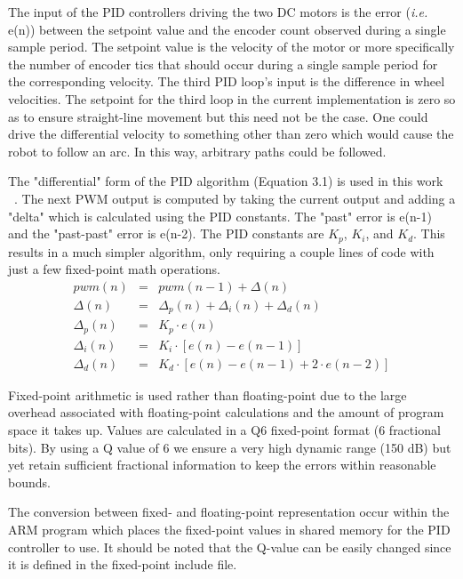 \documentclass[12pt,oneside,final]{siuethesis}
\theoremstyle{definition}
\begin{document}
The input of the PID controllers driving the two DC motors is the error (\emph{i.e.} e(n)) between the setpoint value and the encoder count observed during a single sample period. The setpoint value is the velocity of the motor or more specifically the number of encoder tics that should occur during a single sample period for the corresponding velocity. The third PID loop's input is the difference in wheel velocities. The setpoint for the third loop in the current implementation is zero so as to ensure straight-line movement but this need not be the case. One could drive the differential velocity to something other than zero which would cause the robot to follow an arc. In this way, arbitrary paths could be followed.

The "differential" form of the PID algorithm (Equation 3.1) is used in this work ~\cite{PIDctrl}.  The next PWM output is computed by taking the current output and adding a "delta" which is calculated using the PID constants. The "past" error is e(n-1) and the "past-past" error is e(n-2).  The PID constants are $K_p$, $K_i$, and $K_d$. This results in a much simpler algorithm, only requiring a couple lines of code with just a few fixed-point math operations.
\begin{eqnarray}
pwm(n) &=& pwm(n-1) + \Delta(n) \\
\Delta(n) &=& \Delta_p(n) + \Delta_i(n) + \Delta_d(n) \nonumber \\
\Delta_p(n) &=& K_p \cdot e(n) \nonumber \\
\Delta_i(n) &=& K_i \cdot \left[ e(n) - e(n-1) \right] \nonumber \\
\Delta_d(n) &=& K_d \cdot \left[ e(n) - e(n-1) + 2 \cdot e(n-2) \right] \nonumber
\end{eqnarray}

Fixed-point arithmetic is used rather than floating-point due to the large overhead associated with floating-point calculations and the amount of program space it takes up.  Values are calculated in a Q6 fixed-point format (6 fractional bits). By using a Q value of 6 we ensure a very high dynamic range (150 dB) but yet retain sufficient fractional information to keep the errors within reasonable bounds. 

The conversion between fixed- and floating-point representation occur within the ARM program which places the fixed-point values in shared memory for the PID controller to use. It should  be noted that the Q-value can be easily changed since it is defined in the fixed-point include file.
\end{document}

